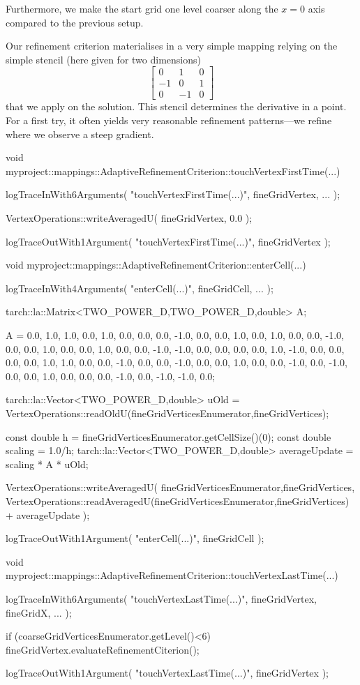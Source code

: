 \noindent
Furthermore, we make the start grid one level coarser along the $x=0$ axis 
compared to the previous setup.

Our refinement criterion materialises in a very simple mapping relying on the
simple stencil (here given for two dimensions)
\[
\left[ \begin{array}{ccc}
  0 & 1 & 0 \\
  -1 & 0 & 1 \\
  0 & -1 & 0
\end{array}  \right]
\]
that we apply on the solution.
This stencil determines the derivative in a point.
For a first try, it often yields very reasonable refinement patterns---we
refine where we observe a steep gradient.

\begin{code}
void myproject::mappings::AdaptiveRefinementCriterion::touchVertexFirstTime(...) { 
  logTraceInWith6Arguments( "touchVertexFirstTime(...)", fineGridVertex, ... );

  VertexOperations::writeAveragedU( fineGridVertex, 0.0 );

  logTraceOutWith1Argument( "touchVertexFirstTime(...)", fineGridVertex );
}


void myproject::mappings::AdaptiveRefinementCriterion::enterCell(...) {
  logTraceInWith4Arguments( "enterCell(...)", fineGridCell, ... );

  tarch::la::Matrix<TWO_POWER_D,TWO_POWER_D,double> A;

  A =  0.0,  1.0,  1.0,  0.0,  1.0,  0.0,  0.0,  0.0,
      -1.0,  0.0,  0.0,  1.0,  0.0,  1.0,  0.0,  0.0,
      -1.0,  0.0,  0.0,  1.0,  0.0,  0.0,  1.0,  0.0,
       0.0, -1.0, -1.0,  0.0,  0.0,  0.0,  0.0,  1.0,
      -1.0,  0.0,  0.0,  0.0,  0.0,  1.0,  1.0,  0.0,
       0.0, -1.0,  0.0,  0.0, -1.0,  0.0,  0.0,  1.0,
       0.0,  0.0, -1.0,  0.0, -1.0,  0.0,  0.0,  1.0,
       0.0,  0.0,  0.0, -1.0,  0.0, -1.0, -1.0,  0.0;

  tarch::la::Vector<TWO_POWER_D,double> uOld = 
    VertexOperations::readOldU(fineGridVerticesEnumerator,fineGridVertices);

  const double h       = fineGridVerticesEnumerator.getCellSize()(0);
  const double scaling = 1.0/h;
  tarch::la::Vector<TWO_POWER_D,double> averageUpdate = scaling * A * uOld;

  VertexOperations::writeAveragedU(
    fineGridVerticesEnumerator,fineGridVertices,
    VertexOperations::readAveragedU(fineGridVerticesEnumerator,fineGridVertices) 
    + averageUpdate
  );
 
  logTraceOutWith1Argument( "enterCell(...)", fineGridCell );
}


void myproject::mappings::AdaptiveRefinementCriterion::touchVertexLastTime(...) { 
  logTraceInWith6Arguments( "touchVertexLastTime(...)", fineGridVertex, fineGridX, ... );

  if (coarseGridVerticesEnumerator.getLevel()<6) {
    fineGridVertex.evaluateRefinementCiterion();
  }

  logTraceOutWith1Argument( "touchVertexLastTime(...)", fineGridVertex );
}

\end{code}


